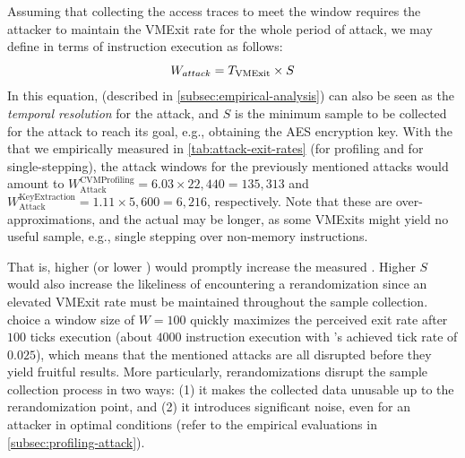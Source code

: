 	Assuming that collecting the access traces to meet the window requires the attacker to maintain the VMExit rate for the whole period of attack, we may define \attwindow in terms of instruction execution as follows:
	\begin{equation*}
		\text{$W_{attack}$} = T_{\text{VMExit}} \times S
	\end{equation*}
	In this equation, \periodvmexit (described in \cref{subsec:empirical-analysis}) can also be seen as the \emph{temporal resolution} for the attack, and $S$ is the minimum sample to be collected for the attack to reach its goal, e.g., obtaining the AES encryption key.
	With the \periodvmexit that we empirically measured in \autoref{tab:attack-exit-rates} (\lnpf for profiling and \lss for single-stepping), the attack windows for the previously mentioned attacks would amount to
	$\ensuremath{W_{\text{Attack}}^{\text{CVMProfiling}} = 6.03\times22,440 = 135,313}$ and
	$\ensuremath{W_{\text{Attack}}^{\text{KeyExtraction}} = 1.11\times 5,600 = 6,216}$, respectively.
	Note that these are over-approximations, and the actual \attwindow may be longer, as some VMExits might yield no useful sample, e.g., single stepping over non-memory instructions.


	That is, higher \periodvmexit{} (or lower \freqvmexit{}) would promptly increase the measured \freqvmexit.
	Higher $S$ would also increase the likeliness of encountering a rerandomization since an elevated VMExit rate must be maintained throughout the sample collection.
	\thename choice a window size of $W=100$ quickly maximizes the perceived exit rate after $100$ ticks execution (about $4000$ instruction execution with \thename's achieved tick rate of $0.025$), which means that the mentioned attacks are all disrupted before they yield fruitful results.
	More particularly, rerandomizations disrupt the sample collection process in two ways: (1) it makes the collected data unusable up to the rerandomization point, and (2) it introduces significant noise, even for an attacker in optimal conditions (refer to the empirical evaluations in \cref{subsec:profiling-attack}).

